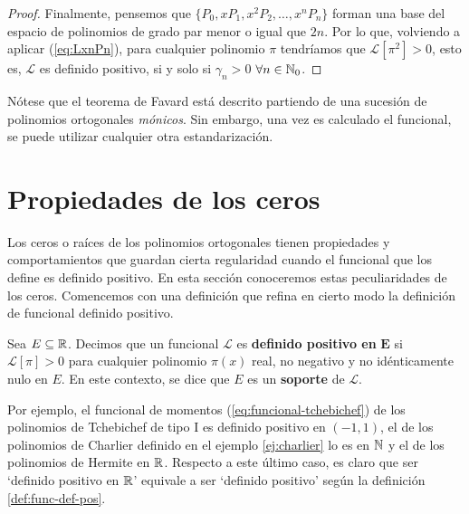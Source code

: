 \begin{proof}
    Finalmente, pensemos que $\{P_0, xP_1, x^2P_2,\dots,x^nP_n\}$ forman una base del espacio de polinomios de grado par menor o igual que $2n$. Por lo que, volviendo a aplicar (\ref{eq:LxnPn}), para cualquier polinomio $\pi$ tendríamos que $\mathcal L[\pi^2] > 0$, esto es, $\mathcal{L}$ es definido positivo, si y solo si $\gamma_n > 0$ $\forall n\in\mathbb{N}_0$.


\end{proof}

\begin{observacion}
    Nótese que el teorema de Favard está descrito partiendo de una sucesión de polinomios ortogonales \textit{mónicos}. Sin embargo, una vez es calculado el funcional, se puede utilizar cualquier otra estandarización. 

\end{observacion}

\section{Propiedades de los ceros}

Los ceros o raíces de los polinomios ortogonales tienen propiedades y comportamientos que guardan cierta regularidad cuando el funcional que los define es definido positivo. En esta sección conoceremos estas peculiaridades de los ceros. Comencemos con una definición que refina en cierto modo la definición de funcional definido positivo.

\begin{definicion}
    Sea $E\subseteq \mathbb{R}$. Decimos que un funcional $\mathcal{L}$ es \textbf{definido positivo en} $\mathbf E$ si $\mathcal{L}[\pi]>0$ para cualquier polinomio $\pi(x)$ real, no negativo y no idénticamente nulo en $E$. En este contexto, se dice que $E$ es un \textbf{soporte} de $\mathcal{L}$.
    
\end{definicion}

Por ejemplo, el funcional de momentos (\ref{eq:funcional-tchebichef}) de los polinomios de Tchebichef de tipo I es definido positivo en $(-1,1)$, el de los polinomios de Charlier definido en el ejemplo \ref{ej:charlier} lo es en $\mathbb{N}$ y el de los polinomios de Hermite en $\mathbb{R}$. Respecto a este último caso, es claro que ser `definido positivo en $\mathbb{R}$' equivale a ser `definido positivo' según la definición \ref{def:func-def-pos}.

